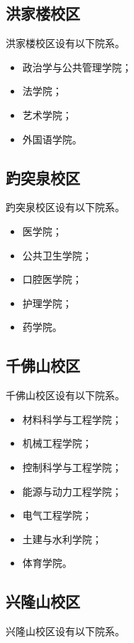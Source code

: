 \documentclass[openany]{sduthesis} %
\begin{document}
\subsection{洪家楼校区}

洪家楼校区设有以下院系。

\begin{itemize}
  \item 政治学与公共管理学院；
  \item 法学院；
  \item 艺术学院；
  \item 外国语学院。
\end{itemize}

\subsection{趵突泉校区}

趵突泉校区设有以下院系。

\begin{itemize}
  \item 医学院；
  \item 公共卫生学院；
  \item 口腔医学院；
  \item 护理学院；
  \item 药学院。
\end{itemize}

\subsection{千佛山校区}

千佛山校区设有以下院系。

\begin{itemize}
  \item 材料科学与工程学院；
  \item 机械工程学院；
  \item 控制科学与工程学院；
  \item 能源与动力工程学院；
  \item 电气工程学院；
  \item 土建与水利学院；
  \item 体育学院。
\end{itemize}

\subsection{兴隆山校区}

兴隆山校区设有以下院系。
\end{document}
